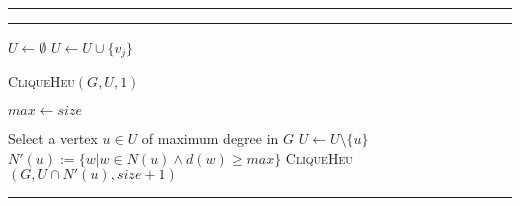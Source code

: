 \vspace{14pt}
\hrule
\vspace{10pt}
\begin{spacing}{\algospacing}
{
{\small
{}\label{alg:mClqHeu}
\hrule
\vspace{8pt}

\noindent\begin{minipage}{.5\textwidth}
\vspace{12pt}
\begin{algorithmic}[1]
{}
\State $U \leftarrow \emptyset$
\State $U \leftarrow U \cup \{v_j\}$ 
\EndIf
\EndFor

\State \textsc{CliqueHeu}$(G, U, 1)$
\EndIf

\EndFor
\EndProcedure
\end{algorithmic}
\end{minipage}%
\begin{minipage}{.5\textwidth}
\vspace{-7pt}
\label{alg:clqHeu}
\begin{algorithmic}[1]

\State $max \leftarrow size$
\EndIf
{}
\EndIf


\State Select a vertex $u \in U$ of maximum degree in $G$ \label{maxDsel}
\State $U \leftarrow U \setminus \{u\} $
\State $N'(u):= \{w | w \in N(u) \wedge d(w) \ge max\}$  \label{pr4}
\State \textsc{CliqueHeu}$( G, U \cap N'(u), size + 1)$


\EndProcedure

\end{algorithmic}
\end{minipage}
}
}
\end{spacing}
\vspace{10pt}
\hrule
\vspace{14pt}



















